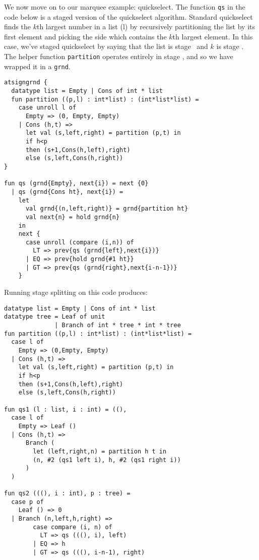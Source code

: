 
We now move on to our marquee example: quickselect.
The function {\tt qs} in the code below is a staged version of the quickselect algorithm.
Standard quickselect finds the $k$th largest number in a list (l) by recursively partitioning the list by its 
first element and picking the side which contains the $k$th largest element.
In this case, we've staged quickselect by saying that the list is stage \bbone\ and $k$ is stage \bbtwo.
The helper function {\tt partition} operates entirely in stage \bbone, and so we have wrapped it in a \texttt{grnd}.
\begin{lstlisting} 
atsigngrnd { 
  datatype list = Empty | Cons of int * list
  fun partition ((p,l) : int*list) : (int*list*list) = 
    case unroll l of 
      Empty => (0, Empty, Empty) 
    | Cons (h,t) => 
      let val (s,left,right) = partition (p,t) in 
      if h<p 
      then (s+1,Cons(h,left),right) 
      else (s,left,Cons(h,right))
}

fun qs (grnd{Empty}, next{i}) = next {0} 
  | qs (grnd{Cons ht}, next{i}) =
    let 
      val grnd{(n,left,right)} = grnd{partition ht}
      val next{n} = hold grnd{n}
    in
    next { 
      case unroll (compare (i,n)) of
        LT => prev{qs (grnd{left},next{i})}
      | EQ => prev{hold grnd{#1 ht}}
      | GT => prev{qs (grnd{right},next{i-n-1})}
    }
\end{lstlisting}
Running stage splitting on this code produces:
\begin{lstlisting} 
datatype list = Empty | Cons of int * list
datatype tree = Leaf of unit 
              | Branch of int * tree * int * tree
fun partition ((p,l) : int*list) : (int*list*list) = 
  case l of 
    Empty => (0,Empty, Empty) 
  | Cons (h,t) => 
    let val (s,left,right) = partition (p,t) in 
    if h<p 
    then (s+1,Cons(h,left),right) 
    else (s,left,Cons(h,right))

fun qs1 (l : list, i : int) = ((), 
  case l of
    Empty => Leaf ()
  | Cons (h,t) => 
      Branch (
        let (left,right,n) = partition h t in
        (n, #2 (qs1 left i), h, #2 (qs1 right i))
      )
  )

fun qs2 (((), i : int), p : tree) = 
  case p of
    Leaf () => 0
  | Branch (n,left,h,right) =>
        case compare (i, n) of 
          LT => qs (((), i), left) 
        | EQ => h 
        | GT => qs (((), i-n-1), right)

\end{lstlisting}


